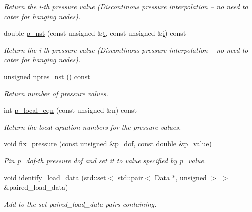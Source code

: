 \begin{DoxyCompactItemize}
\begin{DoxyCompactList}\small\item\em Return the i-\/th pressure value (Discontinous pressure interpolation -- no need to cater for hanging nodes). \end{DoxyCompactList}\item 
double \hyperlink{classoomph_1_1GeneralisedNewtonianQCrouzeixRaviartElement_ab7a1cfbce6b38ad1df95a9c3a6b8f597}{p\+\_\+nst} (const unsigned \&\hyperlink{cfortran_8h_af6f0bd3dc13317f895c91323c25c2b8f}{t}, const unsigned \&\hyperlink{cfortran_8h_adb50e893b86b3e55e751a42eab3cba82}{i}) const
\begin{DoxyCompactList}\small\item\em Return the i-\/th pressure value (Discontinous pressure interpolation -- no need to cater for hanging nodes). \end{DoxyCompactList}\item 
unsigned \hyperlink{classoomph_1_1GeneralisedNewtonianQCrouzeixRaviartElement_afdd70f9e267fd6acfb87c9a842c7812c}{npres\+\_\+nst} () const
\begin{DoxyCompactList}\small\item\em Return number of pressure values. \end{DoxyCompactList}\item 
int \hyperlink{classoomph_1_1GeneralisedNewtonianQCrouzeixRaviartElement_ade39fac0866f29d4e87fefd567fc33f9}{p\+\_\+local\+\_\+eqn} (const unsigned \&n) const
\begin{DoxyCompactList}\small\item\em Return the local equation numbers for the pressure values. \end{DoxyCompactList}\item 
void \hyperlink{classoomph_1_1GeneralisedNewtonianQCrouzeixRaviartElement_abbd85f033c570ea3d4e4033639436998}{fix\+\_\+pressure} (const unsigned \&p\+\_\+dof, const double \&p\+\_\+value)
\begin{DoxyCompactList}\small\item\em Pin p\+\_\+dof-\/th pressure dof and set it to value specified by p\+\_\+value. \end{DoxyCompactList}\item 
void \hyperlink{classoomph_1_1GeneralisedNewtonianQCrouzeixRaviartElement_a49a4adf55b10a9aab75f864597e892cd}{identify\+\_\+load\+\_\+data} (std\+::set$<$ std\+::pair$<$ \hyperlink{classoomph_1_1Data}{Data} $\ast$, unsigned $>$ $>$ \&paired\+\_\+load\+\_\+data)
\begin{DoxyCompactList}\small\item\em Add to the set {\ttfamily paired\+\_\+load\+\_\+data} pairs containing. \end{DoxyCompactList}\item 

\end{DoxyCompactItemize}
